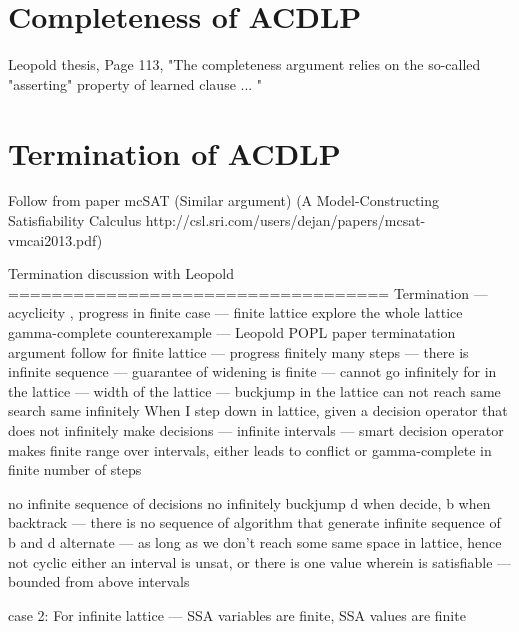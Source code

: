 \section{Completeness of ACDLP}
%
Leopold thesis, Page 113, 
"The completeness argument relies on the so-called "asserting" property of
learned clause ... "

\section{Termination of ACDLP}
%
Follow from paper mcSAT (Similar argument)
(A Model-Constructing Satisfiability Calculus 
http://csl.sri.com/users/dejan/papers/mcsat-vmcai2013.pdf)

Termination discussion with Leopold
===================================
Termination —
acyclicity ,
progress in finite case — finite lattice explore the whole lattice
gamma-complete counterexample —
Leopold POPL paper terminatation argument follow for finite lattice — progress finitely many steps — there is infinite sequence — guarantee of widening is finite — cannot go infinitely for in the lattice — width of the lattice — buckjump in the lattice can not reach same search same infinitely
When I step down in lattice, given a decision operator that does not infinitely make decisions — infinite intervals — smart decision operator makes finite range over intervals, either leads to conflict or gamma-complete in finite number of steps

    no infinite sequence of decisions
    no infinitely buckjump
    d when decide, b when backtrack — there is no sequence of algorithm that generate infinite sequence of b and d alternate — as long as we don’t reach some same space in lattice, hence not cyclic
    either an interval is unsat, or there is one value wherein is satisfiable
    — bounded from above intervals

case 2: For infinite lattice
— SSA variables are finite, SSA values are finite
